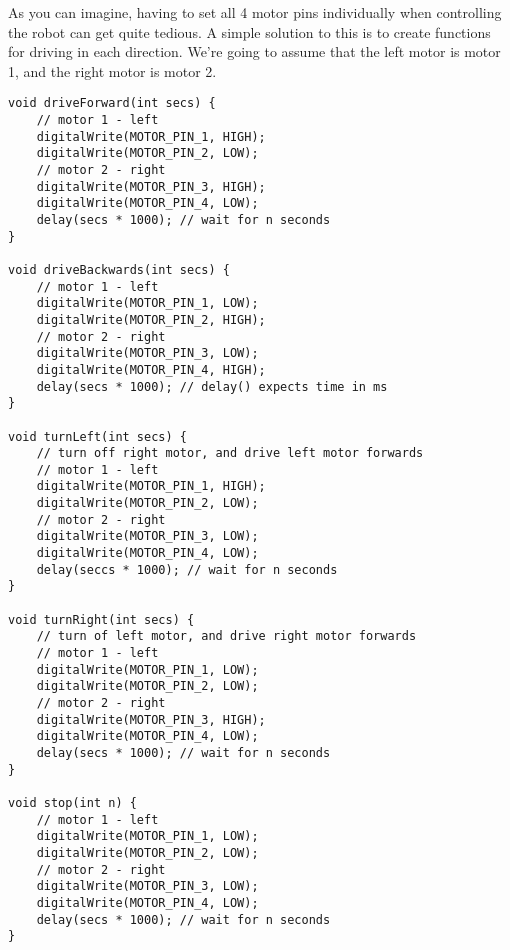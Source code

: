 \documentclass[../TinyBot.tex]{subfiles}
\begin{document}
As you can imagine, having to set all 4 motor pins individually when controlling the robot can get quite tedious. A simple solution to this is to create functions for driving in each direction. We're going to assume that the left motor is motor 1, and the right motor is motor 2.

\begin{lstlisting}
void driveForward(int secs) {
    // motor 1 - left
    digitalWrite(MOTOR_PIN_1, HIGH);
    digitalWrite(MOTOR_PIN_2, LOW);
    // motor 2 - right
    digitalWrite(MOTOR_PIN_3, HIGH);
    digitalWrite(MOTOR_PIN_4, LOW);
    delay(secs * 1000); // wait for n seconds
}

void driveBackwards(int secs) {
    // motor 1 - left
    digitalWrite(MOTOR_PIN_1, LOW);
    digitalWrite(MOTOR_PIN_2, HIGH);
    // motor 2 - right
    digitalWrite(MOTOR_PIN_3, LOW);
    digitalWrite(MOTOR_PIN_4, HIGH);
    delay(secs * 1000); // delay() expects time in ms
}

void turnLeft(int secs) {
    // turn off right motor, and drive left motor forwards
    // motor 1 - left
    digitalWrite(MOTOR_PIN_1, HIGH);
    digitalWrite(MOTOR_PIN_2, LOW);
    // motor 2 - right
    digitalWrite(MOTOR_PIN_3, LOW);
    digitalWrite(MOTOR_PIN_4, LOW);
    delay(seccs * 1000); // wait for n seconds
}

void turnRight(int secs) {
    // turn of left motor, and drive right motor forwards
    // motor 1 - left
    digitalWrite(MOTOR_PIN_1, LOW);
    digitalWrite(MOTOR_PIN_2, LOW);
    // motor 2 - right
    digitalWrite(MOTOR_PIN_3, HIGH);
    digitalWrite(MOTOR_PIN_4, LOW);
    delay(secs * 1000); // wait for n seconds
}

void stop(int n) {
    // motor 1 - left
    digitalWrite(MOTOR_PIN_1, LOW);
    digitalWrite(MOTOR_PIN_2, LOW);
    // motor 2 - right
    digitalWrite(MOTOR_PIN_3, LOW);
    digitalWrite(MOTOR_PIN_4, LOW);
    delay(secs * 1000); // wait for n seconds
}
\end{lstlisting}
\end{document}
